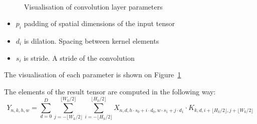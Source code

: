 \begin{figure}[h]
\begin{center}
    \\
    \end{center}
    \caption{Visualisation of convolution layer parameters}\label{conv2dparams}
\end{figure}

\begin{itemize}
    \item $p_i$ padding of spatial dimensions of the input tensor
    \item $d_i$ is dilation. Spacing between kernel elements
    \item $s_i$ is stride. A stride of the convolution
\end{itemize}

The visualisation of each parameter is shown on Figure~\ref{conv2dparams}~\cite{conv2dParamsArticle}

The elements of the result tensor are computed in the following way:
\[
    Y_{n, k, h, w} = \sum\limits_{d=0}^{D}\sum\limits_{j=-\lfloor W_k / 2\rfloor}^{\lfloor W_k / 2\rfloor}\sum\limits_{i=-\lfloor H_k / 2\rfloor}^{\lfloor H_k / 2\rfloor}
    X_{n, d, h \cdot s_0 + i \cdot d_0, w \cdot s_1 + j \cdot d_1} \cdot K_{k, d, i + \lfloor H_k / 2\rfloor, j + \lfloor W_k / 2\rfloor}
\]

